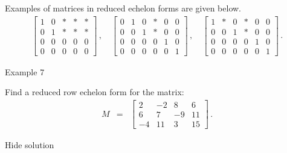 Examples of matrices in reduced echelon forms are given below. \begin{eqnarray*} \left[\begin{array}{ccccc} 1& 0 & \ast &\ast &\ast\\ 0&1&\ast & \ast &\ast\\ 0&0&0&0&0\\ 0&0&0&0&0 \end{array}\right]\,, \quad \left[\begin{array}{cccccc} 0 &1 &0 &\ast &0 &0\\ 0 &0 &1 &\ast &0 &0\\ 0 &0 &0 &0 &1 &0\\ 0 &0 &0 &0 &0 &1 \end{array}\right]\,, \quad \left[\begin{array}{cccccc} 1&\ast & 0 &\ast &0 &0\\ 0&0 &1 &\ast &0 &0\\ 0&0 &0 &0 &1 &0\\ 0&0 &0 &0 &0 &1 \end{array}\right]\,. \end{eqnarray*}

Example 7


Find a reduced row echelon form for the matrix: \begin{eqnarray*} M&=&\left[\begin{array}{cccc}2&-2&8&6\\ 6&7&-9&11\\ -4&11&3&15\end{array}\right]\,. \end{eqnarray*}

Hide solution

